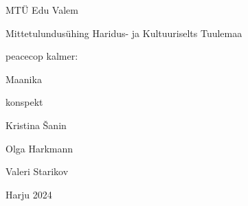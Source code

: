 \begin{titlepage}
\par{MTÜ Edu Valem}
\par{Mittetulundusühing Haridus- ja Kultuuriselts Tuulemaa}
\vspace{0.3\textheight}
\par{peacecop kalmer:}
\LARGE
\par{Maanika}
\normalsize
\par{konspekt}
\vspace{0.3\textheight}
\begin{flushright}
\par{Kristina Šanin}
\par{Olga Harkmann}
\par{Valeri Starikov}
\end{flushright}
\vfill
Harju
\hfill
2024
\end{titlepage}
